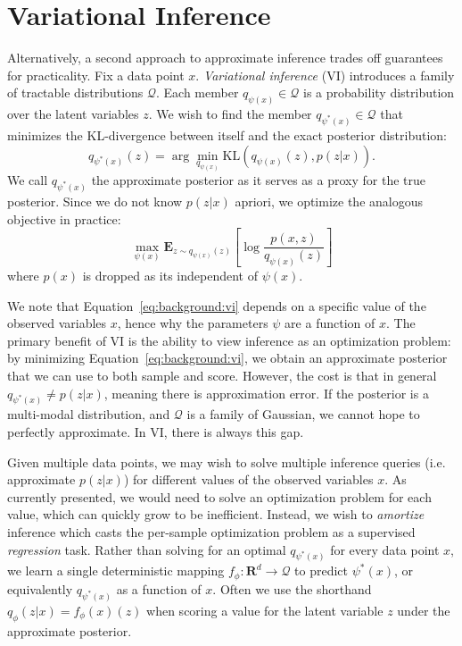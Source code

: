 \section{Variational Inference}
\label{sec:background:vi}

Alternatively, a second approach to approximate inference trades off guarantees for practicality. Fix a data point $x$. \textit{Variational inference} (VI) introduces a family of tractable distributions $\mathcal{Q}$. Each member $q_{\psi(x)} \in \mathcal{Q}$ is a probability distribution over the latent variables $z$. We wish to find the member $q_{\psi^*(x)} \in \mathcal{Q}$ that minimizes the KL-divergence between itself and the exact posterior distribution:
\begin{equation}
    q_{\psi^*(x)}(z) = \arg \min_{q_{\psi(x)}} \text{KL}(q_{\psi(x)}(z), p(z|x)).
    \label{eq:background:vi}
\end{equation}
We call $q_{\psi^*(x)}$ the approximate posterior as it serves as a proxy for the true posterior. Since we do not know $p(z|x)$ apriori, we optimize the analogous objective in practice:
\begin{equation}
    \max_{\psi(x)} \mathbf{E}_{z \sim q_{\psi(x)}(z)} \left[\log \frac{p(x, z)}{q_{\psi(x)}(z)} \right]
\end{equation}
where $p(x)$ is dropped as its independent of $\psi(x)$.

We note that Equation~\ref{eq:background:vi} depends on a specific value of the observed variables $x$, hence why the parameters $\psi$ are a function of $x$. The primary benefit of VI is the ability to view inference as an optimization problem: by minimizing Equation~\ref{eq:background:vi}, we obtain an  approximate posterior that we can use to both sample and score. However, the cost is that in general $q_{\psi^*(x)} \neq p(z|x)$, meaning there is approximation error. If the posterior is a multi-modal distribution, and $\mathcal{Q}$ is a family of Gaussian, we cannot hope to perfectly approximate. In VI, there is always this gap.

Given multiple data points, we may wish to solve multiple inference queries (i.e. approximate $p(z|x)$) for different values of the observed variables $x$. As currently presented, we would need to solve an optimization problem for each value, which can quickly grow to be inefficient. Instead, we wish to \textit{amortize} inference \cite{gershman2014amortized} which casts the per-sample optimization problem as a supervised \textit{regression} task. Rather than solving for an optimal $q_{\psi^*(x)}$ for every data point $x$, we learn a single deterministic mapping $f_\phi: \mathbf{R}^d \rightarrow \mathcal{Q}$ to predict $\psi^*(x)$, or equivalently $q_{\psi^*(x)}$ as a function of $x$. Often we use the shorthand $q_\phi(z|x) = f_\phi(x)(z)$ when scoring a value for the latent variable $z$ under the approximate posterior.

